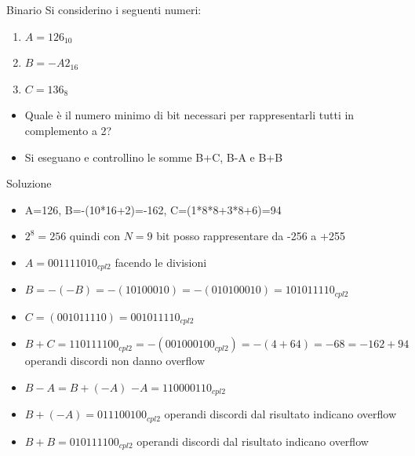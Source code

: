 \documentclass[aspectratio=169,]{beamer}
\begin{document}
%

\begin{frame}{Binario}
    Si considerino i seguenti numeri:
    \begin{enumerate}
        \item $A=126_{10}$
        \item $B=-A2_{16}$
        \item $C=136_8$
    \end{enumerate}

    \begin{itemize}
        \item Quale è il numero minimo di bit necessari per rappresentarli tutti in complemento a 2?
        \item Si eseguano e controllino le somme B+C, B-A e B+B
    \end{itemize}
\end{frame}

\begin{frame}[allowframebreaks]{Soluzione}
    \begin{itemize}
        \item A=126, B=-(10*16+2)=-162, C=(1*8*8+3*8+6)=94
        \item $2^8 = 256$ quindi con $N=9$ bit posso rappresentare da -256 a +255
        \item $A=001111010_{cpl2}$ facendo le divisioni
        \item $B=-(-B)=-(1010 0010)=-(010100010)=101011110_{cpl2}$
        \item $C=(001 011 110) = 001011110_{cpl2}$
        \item $B+C = 110111100_{cpl2} = -(001000100_{cpl2}) = -(4+64) = -68 = -162+94$ operandi discordi non danno overflow
        \item $B-A = B+(-A)$ $-A = 110000110_{cpl2}$
        \item $B+(-A) = 011100100_{cpl2}$ operandi discordi dal risultato indicano overflow
        \item $B+B = 010111100_{cpl2}$ operandi discordi dal risultato indicano overflow
    \end{itemize}
\end{frame}
\end{document}
